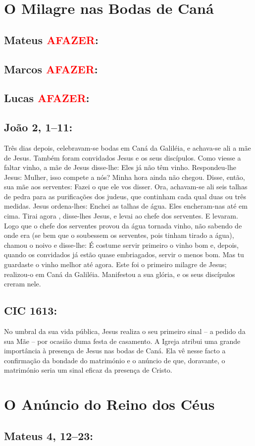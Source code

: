\documentclass[10pt,a5paper]{book}
\newcommand{\from}[1]{\subsection*{#1}}
\newcommand{\TODO}{\textcolor{red}{\ttfamily AFAZER}}
\begin{document}

\section{O Milagre nas Bodas de Caná}

\from{Mateus \TODO:}

\from{Marcos \TODO:}

\from{Lucas \TODO:}

\from{João 2, 1--11:}

Três dias depois, celebravam-se bodas em Caná da Galiléia, e achava-se ali a mãe de Jesus.
Também foram convidados Jesus e os seus discípulos.
Como viesse a faltar vinho, a mãe de Jesus disse-lhe: Eles já não têm vinho.
Respondeu-lhe Jesus: Mulher, isso compete a nós? Minha hora ainda não chegou.
Disse, então, sua mãe aos serventes: Fazei o que ele vos disser.
Ora, achavam-se ali seis talhas de pedra para as purificações dos judeus, que continham cada qual duas ou três medidas.
Jesus ordena-lhes: Enchei as talhas de água. Eles encheram-nas até em cima.
Tirai agora , disse-lhes Jesus, e levai ao chefe dos serventes. E levaram.
Logo que o chefe dos serventes provou da água tornada vinho, não sabendo de onde era (se bem que o soubessem os serventes, pois tinham tirado a água), chamou o noivo
e disse-lhe: É costume servir primeiro o vinho bom e, depois, quando os convidados já estão quase embriagados, servir o menos bom. Mas tu guardaste o vinho melhor até agora.
Este foi o primeiro milagre de Jesus; realizou-o em Caná da Galiléia. Manifestou a sua glória, e os seus discípulos creram nele.

\from{CIC 1613:}

No umbral da sua vida pública, Jesus realiza o seu primeiro sinal -- a pedido da sua Mãe -- por ocasião duma festa de casamento. A Igreja atribui uma grande importância à presença de Jesus nas bodas de Caná. Ela vê nesse facto a confirmação da bondade do matrimónio e o anúncio de que, doravante, o matrimónio seria um sinal eficaz da presença de Cristo.


\section{O Anúncio do Reino dos Céus}

\from{Mateus 4, 12--23:}
\end{document}
